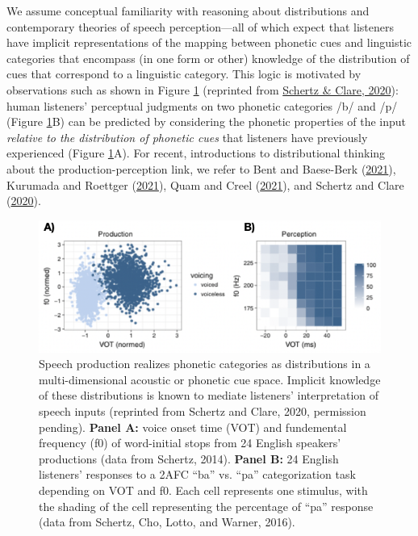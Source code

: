 \documentclass[
  11pt,
  man,floatsintext]{apa6}
\begin{document}
We assume conceptual familiarity with reasoning about distributions and contemporary theories of speech perception---all of which expect that listeners have implicit representations of the mapping between phonetic cues and linguistic categories that encompass (in one form or other) knowledge of the distribution of cues that correspond to a linguistic category. This logic is motivated by observations such as shown in Figure \ref{fig:schertzclare} (reprinted from \protect\hyperlink{ref-schertz-clare2020}{Schertz \& Clare, 2020}): human listeners' perceptual judgments on two phonetic categories /b/ and /p/ (Figure \ref{fig:schertzclare}B) can be predicted by considering the phonetic properties of the input \emph{relative to the distribution of phonetic cues} that listeners have previously experienced (Figure \ref{fig:schertzclare}A). For recent, introductions to distributional thinking about the production-perception link, we refer to Bent and Baese-Berk (\protect\hyperlink{ref-bent-baeseberk2021}{2021}), Kurumada and Roettger (\protect\hyperlink{ref-kurumada-roettger2021}{2021}), Quam and Creel (\protect\hyperlink{ref-quam-creel2021}{2021}), and Schertz and Clare (\protect\hyperlink{ref-schertz-clare2020}{2020}).

\begin{figure}[h]
\begin{center}
\includegraphics[width=.7\columnwidth]{../figures/diagrams/schertzclare.png}
\caption{Speech production realizes phonetic categories as distributions in a multi-dimensional acoustic or phonetic cue space. Implicit knowledge of these distributions is known to mediate listeners’ interpretation of speech inputs (reprinted from Schertz and Clare, 2020, permission pending). {\bf Panel A:} voice onset time (VOT) and fundemental frequency (f0) of word-initial stops from 24 English speakers' productions (data from Schertz, 2014). {\bf Panel B:} 24 English listeners' responses to a 2AFC ``ba'' vs. ``pa'' categorization task depending on VOT and f0. Each cell represents one stimulus, with the shading of the cell representing the percentage of ``pa'' response (data from Schertz, Cho, Lotto, and Warner, 2016).}\label{fig:schertzclare}
\end{center}
\end{figure}
\end{document}
